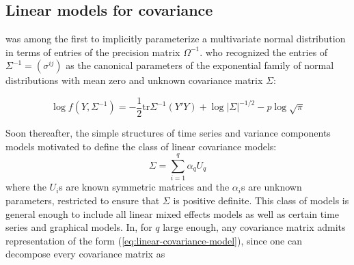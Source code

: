 \bigskip





\bigskip

\subsection{Linear models for covariance}
\cite{gabriel1962ante} was among the first to implicitly parameterize a multivariate normal distribution in terms of entries of the precision matrix $\Omega^{-1}$.  \cite{dempster1972covariance} who recognized the entries of $\Sigma^{-1} = \left(\sigma^{ij} \right)$ as the canonical parameters of the exponential family of normal distributions with mean zero and unknown covariance matrix $\Sigma$:

\[
\log f\left(Y, \Sigma^{-1}\right) = -\frac{1}{2}\mbox{tr}\Sigma^{-1} \left(Y'Y\right) + \log\vert \Sigma \vert^{-1/2} - p \log\sqrt{\pi}
\]

Soon thereafter, the simple structures of time series and variance components models motivated \cite{anderson1973asymptotically} to define the class of linear covariance models:
\begin{equation}\label{eq:linear-covariance-model}
\Sigma = \sum_{i = 1}^q \alpha_qU_q
\end{equation}
\noindent
where the $U_i$s are known symmetric matrices and the $\alpha_i$s are unknown parameters, restricted to ensure that $\Sigma$ is positive definite. This class of models is general enough to include all linear mixed effects models as well as certain time series and graphical models. In, for $q$ large enough, any covariance matrix admits representation of the form (\ref{eq:linear-covariance-model}), since one can decompose every covariance matrix as 

